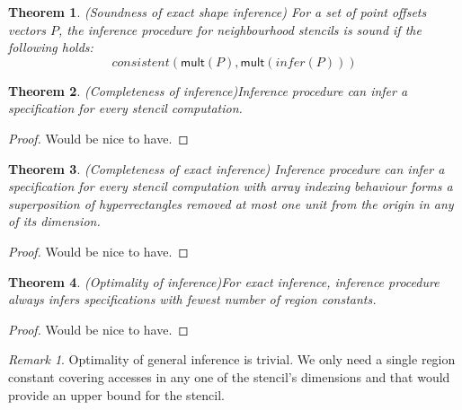 \documentclass[acmlarge,review]{acmart}
\theoremstyle{definition}
\theoremstyle{plain}
\newtheorem{thm}{Theorem}
\theoremstyle{remark}
\newtheorem{remark}{Remark}
\begin{document}
\begin{thm}{(Soundness of exact shape inference)}
  For a set of point offsets vectors $P$, the inference procedure for
  neighbourhood stencils is sound if the following holds:
%
  \begin{equation*}
    \mathit{consistent}(\mathsf{mult}(P),\mathsf{mult}(\mathit{infer}(P)))
  \end{equation*}
\end{thm}

\begin{thm}{(Completeness of inference)}\label{thm:inf-completeness}
  Inference procedure can infer a specification for every stencil computation.
\end{thm}
%
\begin{proof}
  Would be nice to have.
\end{proof}

\begin{thm}{(Completeness of exact inference)}
  Inference procedure can infer a specification for every stencil computation
  with array indexing behaviour forms a superposition of hyperrectangles removed
  at most one unit from the origin in any of its dimension.
\end{thm}
%
\begin{proof}
  Would be nice to have.
\end{proof}

\begin{thm}{(Optimality of inference)}\label{thm:inf-optimality}
  For exact inference, inference procedure always infers specifications with
  fewest number of region constants.
\end{thm}
%
\begin{proof}
  Would be nice to have.
\end{proof}

\begin{remark}{}
  Optimality of general inference is trivial. We only need a single region
  constant covering accesses in any one of the stencil's dimensions and that
  would provide an upper bound for the stencil.
\end{remark}
\end{document}

